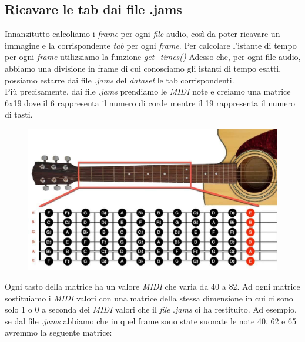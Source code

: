 \subsection{Ricavare le tab dai file .jams}
Innanzitutto calcoliamo i \textit{frame} per ogni \textit{file} audio, così da poter ricavare un immagine e la corrispondente \textit{tab} per ogni \textit{frame}. Per calcolare l'istante di tempo per ogni \textit{frame} utilizziamo la funzione \textit{get\_times()}
\vspace*{2ex}
\vspace*{2ex}
Adesso che, per ogni file audio, abbiamo una divisione in frame di cui conosciamo gli istanti di tempo esatti, possiamo estarre dai file .\textit{jams} del \textit{dataset} le tab corrispondenti.\\ Più precisamente, dai file .\textit{jams} prendiamo le \textit{MIDI} note e creiamo una matrice 6x19 dove il 6 rappresenta il numero di corde mentre il 19 rappresenta il numero di tasti.
\begin{figure}[H]
	\centering
	\includegraphics[scale=0.30]{./images/img12.jpg}
\end{figure}
Ogni tasto della matrice ha un valore \textit{MIDI} che varia da 40 a 82.
\vspace*{2ex}
\vspace*{2ex}
Ad ogni matrice sostituiamo i \textit{MIDI} valori con una matrice della stessa dimensione in cui ci sono solo 1 o 0 a seconda dei \textit{MIDI} valori che il \textit{file} .\textit{jams} ci ha restituito. Ad esempio, se dal file .\textit{jams} abbiamo che in quel frame sono state suonate le note 40, 62 e 65 avremmo la seguente matrice:
\vspace*{2ex}
\vspace*{2ex}
